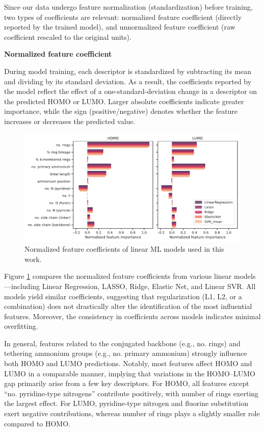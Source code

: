 Since our data undergo feature normalization (standardization) before training, two types of coefficients are relevant: normalized feature coefficient (directly reported by the trained model), and unnormalized feature coefficient (raw coefficient rescaled to the original units).

\textbf{Normalized feature coefficient}

During model training, each descriptor is standardized by subtracting its mean and dividing by its standard deviation. As a result, the coefficients reported by the model reflect the effect of a one-standard-deviation change in a descriptor on the predicted HOMO or LUMO. Larger absolute coefficients indicate greater importance, while the sign (positive/negative) denotes whether the feature increases or decreases the predicted value.

\begin{figure}[htbp]
    \centering
    \includegraphics[width=\textwidth]{figures/HT-ML/figure4-15.pdf}
    \caption{Normalized feature coefficients of linear ML models used in this work.}
    \label{fig:figure4.15}
\end{figure}

Figure \ref{fig:figure4.15} compares the normalized feature coefficients from various linear models—including Linear Regression, LASSO, Ridge, Elastic Net, and Linear SVR. All models yield similar coefficients, suggesting that regularization (L1, L2, or a combination) does not drastically alter the identification of the most influential features. Moreover, the consistency in coefficients across models indicates minimal overfitting.

In general, features related to the conjugated backbone (e.g., no. rings) and tethering ammonium groups (e.g., no. primary ammonium) strongly influence both HOMO and LUMO predictions. Notably, most features affect HOMO and LUMO in a comparable manner, implying that variations in the HOMO–LUMO gap primarily arise from a few key descriptors. For HOMO, all features except “no. pyridine-type nitrogens” contribute positively, with number of rings exerting the largest effect. For LUMO, pyridine-type nitrogen and fluorine substitution exert negative contributions, whereas number of rings plays a slightly smaller role compared to HOMO.

